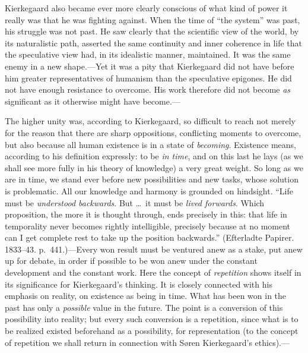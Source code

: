 \documentclass[12pt,a4paper]{book}
\newcommand{\opage}[1]{\marginnote{\footnotesize\textit{[#1]}}}
\begin{document}
Kierkegaard also became ever more clearly conscious of what kind of power
it really was that he was fighting against. When the time of ``the
system'' was past, his struggle was not past. He saw clearly that the
scientific view of the world, by its naturalistic path, asserted the same
continuity and inner coherence in life that
\opage{48}the speculative view had, in its idealistic manner,
maintained. It was the same enemy in a new shape.---Yet it was a pity
that Kierkegaard did not have before him greater representatives of
humanism than the speculative epigones. He did not have enough
resistance to overcome. His work therefore did not become \textit{as}
significant as it otherwise might have become.---

The higher unity was, according to Kierkegaard, so difficult to reach not
merely for the reason that there are sharp oppositions, conflicting
moments to overcome, but also because all human existence is in a state
of \textit{becoming}. Existence means, according to his definition
expressly: to be \textit{in time}, and on this last he lays (as we shall
see more fully in his theory of knowledge) a very great weight. So long
as we are in time, we stand ever before new possibilities and new tasks,
whose solution is problematic. All our knowledge and harmony is grounded
on hindsight. ``Life must be \textit{understood backwards}. But \dots\ it
must be \textit{lived forwards}. Which proposition, the more it is
thought through, ends precisely in this: that life in temporality never
becomes rightly intelligible, precisely because at no moment can I get
complete rest to take up the position backwards.'' (Efterladte Papirer.
1833--43. p.~441.)---Every won result must be ventured anew as a stake,
put anew up for debate, in order if possible to be won anew under the
constant development and the constant work. Here the concept of
\textit{repetition} shows itself in its significance for Kierkegaard's
thinking. It is closely connected with his emphasis on reality, on
existence as being in time. What has been won in the past has only a
\textit{possible} value in the future. The point is a conversion of this
possibility into reality; but every such conversion is a repetition,
since what is to be realized existed beforehand as a possibility, for
representation (to the concept of repetition
\opage{49}we shall return in connection with Søren Kierkegaard's
ethics).---
\end{document}
